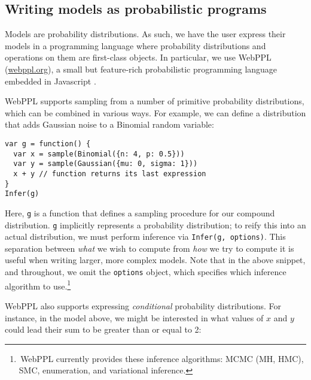 \documentclass[10pt,letterpaper]{article}
\begin{document}

\subsection{Writing models as probabilistic programs}

Models are probability distributions.
As such, we have the user express their models in a programming language where probability distributions and operations on them are first-class objects.
In particular, we use WebPPL (\url{webppl.org}), a small but feature-rich probabilistic programming language embedded in Javascript \citep{dippl}.

WebPPL supports sampling from a number of primitive probability distributions, which can be combined in various ways. For example, we can define a distribution that adds Gaussian noise to a Binomial random variable:

\begin{lstlisting}[mathescape, label={code:forward-model-simple}]
var g = function() {
  var x = sample(Binomial({n: 4, p: 0.5}))
  var y = sample(Gaussian({mu: 0, sigma: 1}))
  x + y // function returns its last expression
}
Infer(g)
\end{lstlisting}
Here, \lstinline{g} is a function that defines a sampling procedure for our compound distribution.
\lstinline{g} implicitly represents a probability distribution; to reify this into an actual distribution, we must perform inference via \texttt{Infer(g, options)}.
This separation between \emph{what} we wish to compute from \emph{how} we try to compute it is useful when writing larger, more complex models.
Note that in the above snippet, and throughout, we omit the \texttt{options} object, which specifies which inference algorithm to use.\footnote{\,WebPPL currently provides these inference algorithms: MCMC (MH, HMC), SMC, enumeration, and variational inference.}

WebPPL also supports expressing \emph{conditional} probability distributions.
For instance, in the model above, we might be interested in what values of $x$ and $y$ could lead their sum to be greater than or equal to 2:
\end{document}
